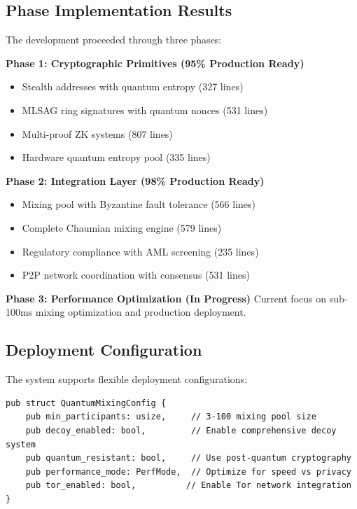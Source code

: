 \documentclass[12pt,a4paper]{article}
\begin{document}
\subsection{Phase Implementation Results}

The development proceeded through three phases:

\textbf{Phase 1: Cryptographic Primitives (95\% Production Ready)}
\begin{itemize}
\item Stealth addresses with quantum entropy (327 lines)
\item MLSAG ring signatures with quantum nonces (531 lines)
\item Multi-proof ZK systems (807 lines)
\item Hardware quantum entropy pool (335 lines)
\end{itemize}

\textbf{Phase 2: Integration Layer (98\% Production Ready)}
\begin{itemize}
\item Mixing pool with Byzantine fault tolerance (566 lines)
\item Complete Chaumian mixing engine (579 lines)
\item Regulatory compliance with AML screening (235 lines)
\item P2P network coordination with consensus (531 lines)
\end{itemize}

\textbf{Phase 3: Performance Optimization (In Progress)}
Current focus on sub-100ms mixing optimization and production deployment.

\subsection{Deployment Configuration}

The system supports flexible deployment configurations:

\begin{lstlisting}[style=rustcode, caption=Deployment Configuration]
pub struct QuantumMixingConfig {
    pub min_participants: usize,     // 3-100 mixing pool size
    pub decoy_enabled: bool,         // Enable comprehensive decoy system
    pub quantum_resistant: bool,     // Use post-quantum cryptography
    pub performance_mode: PerfMode,  // Optimize for speed vs privacy
    pub tor_enabled: bool,          // Enable Tor network integration
}
\end{lstlisting}
\end{document}
